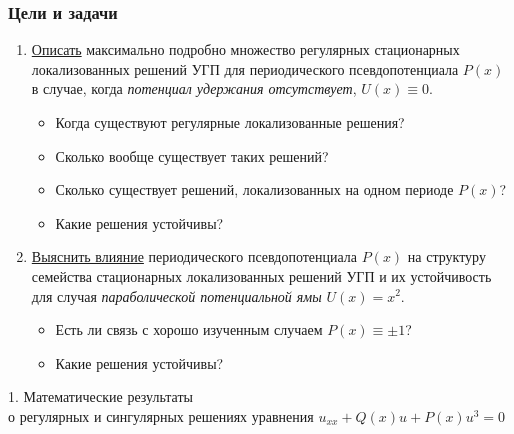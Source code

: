 \documentclass [10pt] {beamer}
\begin{document}
\begin{frame}
	\frametitle{Цели и задачи}
	
	\begin{enumerate}
		\setlength\itemsep{10pt}
		\item \underline{Описать} максимально подробно множество регулярных стационарных локализованных решений УГП для периодического псевдопотенциала $P(x)$ в случае, когда {\it потенциал удержания отсутствует}, $U(x) \equiv 0$.
			\begin{itemize}
				\item Когда существуют регулярные локализованные решения?
				\item Сколько вообще существует таких решений?
 				\item Сколько существует решений, локализованных на одном периоде $P(x)$?
				\item Какие решения устойчивы?
			\end{itemize}
			
		\item \underline{Выяснить влияние} периодического псевдопотенциала $P(x)$ на структуру семейства стационарных локализованных решений УГП и их устойчивость для случая {\it параболической потенциальной ямы} $U(x) = x^2$.
			\begin{itemize}
				\item Есть ли связь с хорошо изученным случаем $P(x) \equiv \pm 1$?
				\item Какие решения устойчивы?
			\end{itemize}
	\end{enumerate}
\end{frame}

\begin{frame}
	\begin{center}
		\LARGE 1. Математические результаты \\ о регулярных и сингулярных решениях уравнения $u_{xx} + Q(x) u + P(x) u^3 = 0$
	\end{center}
\end{frame}
\end{document}
